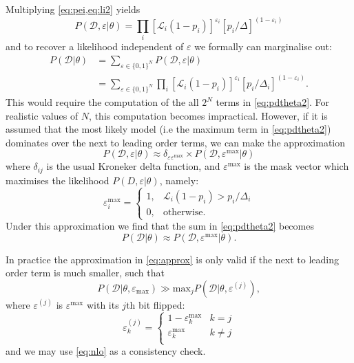 \documentclass[fleqn,usenatbib]{mnras}
\begin{document}
Multiplying \cref{eq:pei,eq:li2} yields
\begin{equation}
    P(\mathcal{D},\varepsilon|\theta) = \prod_{i} \left[\mathcal{L}_{i}(1-p_i)\right]^{\varepsilon_{i}} \left[p_i/\Delta\right]^{(1-\varepsilon_i)}
    \label{eqn:likelihood_eps}
\end{equation}
and to recover a likelihood independent of $\varepsilon$ we formally can marginalise out:
\begin{align}
    P(\mathcal{D}|\theta) &=\sum_{\varepsilon \in \{ 0, 1 \} ^N}P(\mathcal{D},\varepsilon|\theta) \\
    &= \sum_{\varepsilon \in \{ 0, 1 \} ^N} \prod_{i} \left[\mathcal{L}_{i}(1-p_i)\right]^{\varepsilon_{i}} \left[p_i/\Delta_i\right]^{(1-\varepsilon_i)}.
    \label{eq:pdtheta2}
\end{align}
This would require the computation of the all $2^N$ terms in \cref{eq:pdtheta2}. For realistic values of $N$, this computation becomes impractical. However, if it is assumed that the most likely model (i.e the maximum term in \cref{eq:pdtheta2}) dominates over the next to leading order terms, we can make the approximation
\begin{equation}
    P(\mathcal{D},\varepsilon|\theta) \approx \delta_{\varepsilon \varepsilon^\mathrm{max}} \times P(\mathcal{D},\varepsilon^{\mathrm{max}}|\theta)\label{eqn:postierioreps}
\end{equation}
where $\delta_{ij}$ is the usual Kroneker delta function, and
 $\varepsilon^\mathrm{max}$ is the mask vector which maximises the likelihood $P(D,\varepsilon|\theta)$, namely:
\begin{equation}
    \varepsilon^{\mathrm{max}}_{i}=
    \begin{cases}
        1, & \mathcal{L}_i(1-p_i) > p_i/\Delta_i \\
        0, & \text{otherwise}.
    \end{cases}
    \label{eqn:emax}
\end{equation}
Under this approximation we find that the sum in \cref{eq:pdtheta2} becomes
\begin{equation}
    P(\mathcal{D}|\theta) \approx P(\mathcal{D},\varepsilon^{\mathrm{max}}|\theta).\label{eq:approx}
\end{equation}

In practice the approximation in \cref{eq:approx} is only valid if the next to leading order term is much smaller, such that
 \begin{equation}
 P(\mathcal{D}|\theta, \varepsilon_{\mathrm{max}}) \gg \mathrm{max}_j P(\mathcal{D}|\theta,\varepsilon^{(j)})\label{eq:nlo},
\end{equation}
where $\varepsilon^{(j)}$ is $\varepsilon^\mathrm{max}$ with its $j$th bit flipped:
\begin{equation}
    \varepsilon^{(j)}_k = 
    \begin{cases}
    1-\varepsilon^{\mathrm{max}}_k & k=j \\
    \varepsilon^{\mathrm{max}}_k & k\ne j \\
\end{cases}
\end{equation}
and we may use \cref{eq:nlo} as a consistency check.
\end{document}
